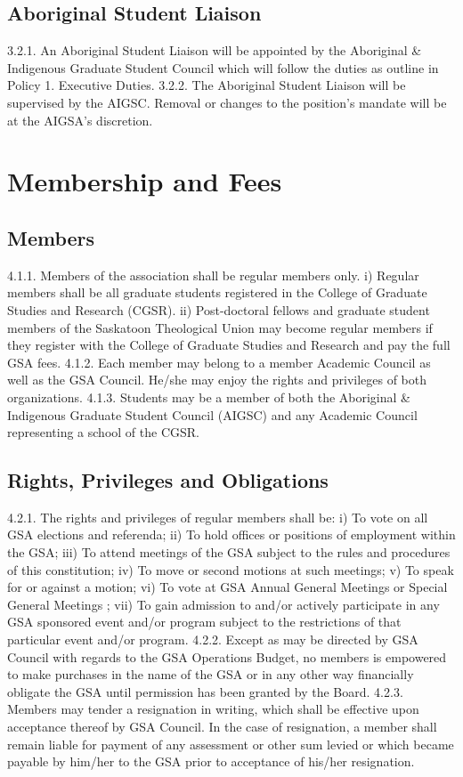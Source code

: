 \documentclass{article}
\begin{document}
\subsection{Aboriginal Student Liaison}
3.2.1. An Aboriginal Student Liaison will be appointed by the Aboriginal \& 
Indigenous Graduate Student Council which will follow the duties as outline 
in Policy 1. Executive Duties. 
3.2.2. The Aboriginal Student Liaison will be supervised by the AIGSC. 
Removal or changes to the position’s mandate will be at the AIGSA’s 
discretion. 
\section{Membership and Fees }
\subsection{Members }
4.1.1. Members of the association shall be regular members only. 
i) Regular members shall be all graduate students registered in the 
College of Graduate Studies and Research (CGSR). 
ii) Post-doctoral fellows and graduate student members of the Saskatoon 
Theological Union may become regular members if they register with 
the College of Graduate Studies and Research and pay the full GSA 
fees. 
4.1.2. Each member may belong to a member Academic Council as well as 
the GSA Council. He/she may enjoy the rights and privileges of both 
organizations. 
4.1.3. Students may be a member of both the Aboriginal \& Indigenous 
Graduate Student Council (AIGSC) and any Academic Council 
representing a school of the CGSR. 
 
\subsection{Rights, Privileges and Obligations }
4.2.1. The rights and privileges of regular members shall be: 
i) To vote on all GSA elections and referenda; 
ii) To hold offices or positions of employment within the GSA; 
iii) To attend meetings of the GSA subject to the rules and procedures of 
this constitution; 
iv) To move or second motions at such meetings; 
v) To speak for or against a motion; 
vi) To vote at GSA Annual General Meetings or Special General 
Meetings ; 
vii) To gain admission to and/or actively participate in any GSA sponsored 
event and/or program subject to the restrictions of that particular event 
and/or program. 
4.2.2. Except as may be directed by GSA Council with regards to the GSA 
Operations Budget, no members is empowered to make purchases in 
the name of the GSA or in any other way financially obligate the GSA 
until permission has been granted by the Board. 
4.2.3. Members may tender a resignation in writing, which shall be effective 
upon acceptance thereof by GSA Council. In the case of resignation, a member shall remain liable for payment of any assessment or other 
sum levied or which became payable by him/her to the GSA prior to 
acceptance of his/her resignation. 
\end{document}
